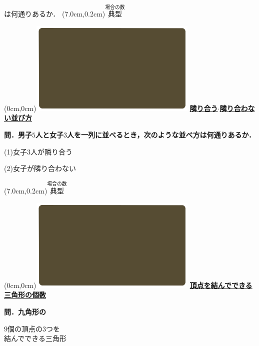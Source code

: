 \documentclass[10pt,
fleqn,
dvipdfmx,
uplatex
]{jsarticle}
\begin{document}
\normalsize
\hfill は何通りあるか．
\at(7.0cm,0.2cm){\small\color{bradorange}$\overset{\text{場合の数}}{\text{典型}}$}


\newpage



\at(0cm,0cm){\includegraphics[width=8cm,bb=0 0 1920 1080]{./youtube/thumbnails/templates/smart_background/場合の数.jpeg}}
{\color{orange}\bf\boldmath\Large\underline{隣り合う$\cdot$隣り合わない並び方}}\vspace{0.3zw}

\normalsize 
\bf\boldmath 問．男子$5$人と女子$3$人を一列に並べるとき，次のような並べ方は何通りあるか．

\huge
(1)女子$3$人が隣り合う

(2)女子が隣り合わない

\at(7.0cm,0.2cm){\small\color{bradorange}$\overset{\text{場合の数}}{\text{典型}}$}


\newpage



\at(0cm,0cm){\includegraphics[width=8cm,bb=0 0 1920 1080]{./youtube/thumbnails/templates/smart_background/場合の数.jpeg}}
{\color{orange}\bf\boldmath\large\underline{頂点を結んでできる三角形の個数}}\vspace{0.1zw}

\normalsize 
\bf\boldmath 問．九角形の

\huge
\vspace{-0.2zw}
\hspace{0.1zw} $9$個の頂点の$3$つを\\
\hfill 結んでできる三角形 \hspace{0.1zw}
\end{document}
